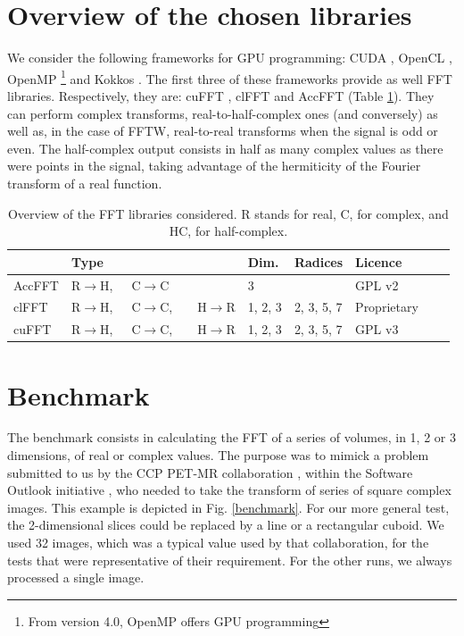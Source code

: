 \documentclass[12pt, a4paper]{article}
\begin{document}
\section{Overview of the chosen libraries}
We consider the following frameworks for GPU programming: CUDA \cite{cuda}, OpenCL \cite{opencl}, OpenMP \cite{openmp}\footnote{From version 4.0, OpenMP offers GPU programming} and Kokkos \cite{kokkos}. The first three of these frameworks provide as well FFT libraries. Respectively, they are: cuFFT \cite{cufft}, clFFT \cite{clfft} and AccFFT \cite{accfft} (Table \ref{ffttable}). They can perform complex transforms, real-to-half-complex ones (and conversely) as well as, in the case of FFTW, real-to-real transforms when the signal is odd or even. The half-complex output consists in half as many complex values as there were points in the signal, taking advantage of the hermiticity of the Fourier transform of a real function.\\ 
\begin{table}[H]
\captionsetup{width=1\textwidth}
\begin{tabular}{|p{2.5cm}||p{2.5cm}|p{1cm}|p{3cm}|p{3cm}|p{2cm}|p{2cm}|}
\hline
& Type & Dim. & Radices & Licence \\
\hline
\hline
AccFFT & R$\to$H,\ \ \  C$\to$C& 3& & GPL v2\\
\hline
clFFT  &  R$\to$H,\ \ \  C$\to$C,\ \ \ \  H$\to$R& 1, 2, 3 & 2, 3, 5, 7 & Proprietary\\
\hline
cuFFT  &  R$\to$H,\ \ \  C$\to$C,\ \ \ \  H$\to$R & 1, 2, 3 & 2, 3, 5, 7 & GPL v3\\
\hline
\end{tabular}
\caption{Overview of the FFT libraries considered. R stands for real, C, for complex, and HC, for half-complex.}
\label{ffttable}
\end{table}
\section{Benchmark}
The benchmark \cite{code} consists in calculating the FFT of a series of volumes, in 1, 2 or 3 dimensions, of real or complex values. The purpose was to mimick a problem submitted to us by the CCP PET-MR collaboration \cite{ccppetmr}, within the Software Outlook initiative \cite{softwareoutlook}, who needed to take the transform of series of square complex images. This example is depicted in Fig. \ref{benchmark}. For our more general test, the 2-dimensional slices could be replaced by a line or a rectangular cuboid. We used 32 images, which was a typical value used by that collaboration, for the tests that were representative of their requirement. For the other runs, we always processed a single image.\\
\end{document}
